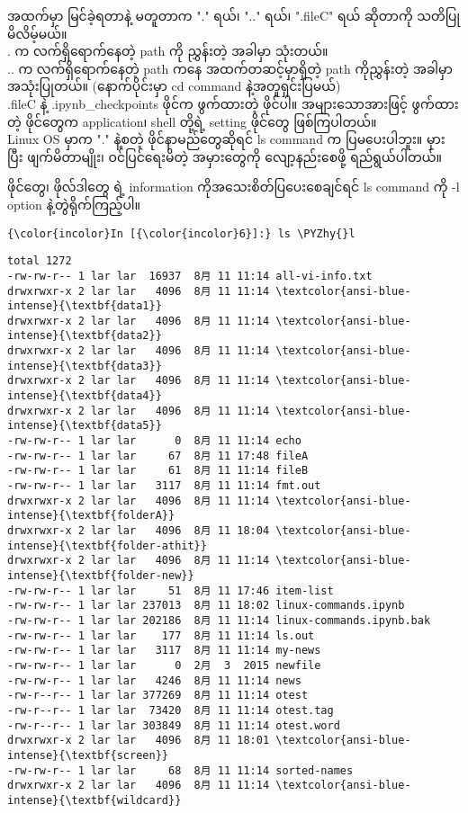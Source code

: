 \documentclass[11pt]{article}
\def\PYZhy{\char`\-}
\begin{document}
    အထက်မှာ မြင်ခဲ့ရတာနဲ့ မတူတာက "." ရယ်၊ ".." ရယ်၊ ".fileC" ရယ် ဆိုတာကို
သတိပြုမိလိမ့်မယ်။\\
. က လက်ရှိရောက်နေတဲ့ path ကို ညွှန်းတဲ့ အခါမှာ သုံးတယ်။\\
.. က လက်ရှိရောက်နေတဲ့ path ကနေ အထက်တဆင့်မှာရှိတဲ့ path ကိုညွှန်းတဲ့
အခါမှာ အသုံးပြုတယ်။ (နောက်ပိုင်းမှာ cd command နဲ့အတူရှင်းပြမယ်)\\
.fileC နဲ့ .ipynb\_checkpoints ဖိုင်က ဖွက်ထားတဲ့ ဖိုင်ပါ။
အများသောအားဖြင့် ဖွက်ထားတဲ့ ဖိုင်တွေက application၊ shell တို့ရဲ့ setting
ဖိုင်တွေ ဖြစ်ကြပါတယ်။\\
Linux OS မှာက "." နဲ့စတဲ့ ဖိုင်နာမည်တွေဆိုရင် ls command က ပြမပေးပါဘူး။
မှားပြီး ဖျက်မိတာမျိုး၊ ဝင်ပြင်ရေးမိတဲ့ အမှားတွေကို လျော့နည်းစေဖို့
ရည်ရွယ်ပါတယ်။

ဖိုင်တွေ၊ ဖိုလ်ဒါတွေ ရဲ့ information ကိုအသေးစိတ်ပြပေးစေချင်ရင် ls
command ကို -l option နဲ့တွဲရိုက်ကြည့်ပါ။

    \begin{Verbatim}[commandchars=\\\{\}]
{\color{incolor}In [{\color{incolor}6}]:} ls \PYZhy{}l
\end{Verbatim}

    \begin{Verbatim}[commandchars=\\\{\}]
total 1272
-rw-rw-r-- 1 lar lar  16937  8月 11 11:14 all-vi-info.txt
drwxrwxr-x 2 lar lar   4096  8月 11 11:14 \textcolor{ansi-blue-intense}{\textbf{data1}}
drwxrwxr-x 2 lar lar   4096  8月 11 11:14 \textcolor{ansi-blue-intense}{\textbf{data2}}
drwxrwxr-x 2 lar lar   4096  8月 11 11:14 \textcolor{ansi-blue-intense}{\textbf{data3}}
drwxrwxr-x 2 lar lar   4096  8月 11 11:14 \textcolor{ansi-blue-intense}{\textbf{data4}}
drwxrwxr-x 2 lar lar   4096  8月 11 11:14 \textcolor{ansi-blue-intense}{\textbf{data5}}
-rw-rw-r-- 1 lar lar      0  8月 11 11:14 echo
-rw-rw-r-- 1 lar lar     67  8月 11 17:48 fileA
-rw-rw-r-- 1 lar lar     61  8月 11 11:14 fileB
-rw-rw-r-- 1 lar lar   3117  8月 11 11:14 fmt.out
drwxrwxr-x 2 lar lar   4096  8月 11 11:14 \textcolor{ansi-blue-intense}{\textbf{folderA}}
drwxrwxr-x 2 lar lar   4096  8月 11 18:04 \textcolor{ansi-blue-intense}{\textbf{folder-athit}}
drwxrwxr-x 2 lar lar   4096  8月 11 11:14 \textcolor{ansi-blue-intense}{\textbf{folder-new}}
-rw-rw-r-- 1 lar lar     51  8月 11 17:46 item-list
-rw-rw-r-- 1 lar lar 237013  8月 11 18:02 linux-commands.ipynb
-rw-rw-r-- 1 lar lar 202186  8月 11 11:14 linux-commands.ipynb.bak
-rw-rw-r-- 1 lar lar    177  8月 11 11:14 ls.out
-rw-rw-r-- 1 lar lar   3117  8月 11 11:14 my-news
-rw-rw-r-- 1 lar lar      0  2月  3  2015 newfile
-rw-rw-r-- 1 lar lar   4246  8月 11 11:14 news
-rw-r--r-- 1 lar lar 377269  8月 11 11:14 otest
-rw-r--r-- 1 lar lar  73420  8月 11 11:14 otest.tag
-rw-r--r-- 1 lar lar 303849  8月 11 11:14 otest.word
drwxrwxr-x 2 lar lar   4096  8月 11 18:01 \textcolor{ansi-blue-intense}{\textbf{screen}}
-rw-rw-r-- 1 lar lar     68  8月 11 11:14 sorted-names
drwxrwxr-x 2 lar lar   4096  8月 11 11:14 \textcolor{ansi-blue-intense}{\textbf{wildcard}}

    \end{Verbatim}
\end{document}
